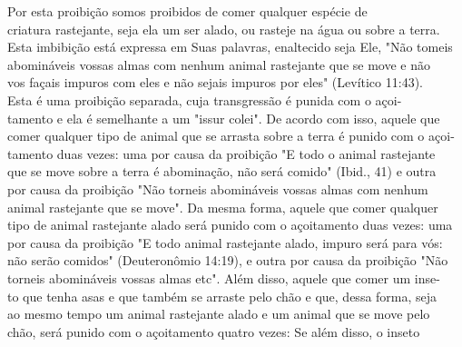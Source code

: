 Por esta proibição somos proibidos de comer qualquer espécie de\\
criatura rastejante, seja ela um ser alado, ou rasteje na água ou sobre
a terra.\\
Esta imbibição está expressa em Suas palavras, enaltecido seja Ele, "Não
tomeis\\
abomináveis vossas almas com nenhum animal rastejante que se move e
não\\
vos façais impuros com eles e não sejais impuros por eles" (Levítico
11:43).\\
Esta é uma proibição separada, cuja transgressão é punida com o açoi-\\
tamento e ela é semelhante a um "issur colei". De acordo com isso,
aquele que\\
comer qualquer tipo de animal que se arrasta sobre a terra é punido com
o açoi-\\
tamento duas vezes: uma por causa da proibição "E todo o animal
rastejante\\
que se move sobre a terra é abominação, não será comido" (Ibid., 41) e
outra\\
por causa da proibição "Não torneis abomináveis vossas almas com
nenhum\\
animal rastejante que se move". Da mesma forma, aquele que comer
qualquer\\
tipo de animal rastejante alado será punido com o açoitamento duas
vezes: uma\\
por causa da proibição "E todo animal rastejante alado, impuro será para
vós:\\
não serão comidos" (Deuteronômio 14:19), e outra por causa da proibição
"Não\\
torneis abomináveis vossas almas etc". Além disso, aquele que comer um
inse-\\
to que tenha asas e que também se arraste pelo chão e que, dessa forma,
seja\\
ao mesmo tempo um animal rastejante alado e um animal que se move pelo\\
chão, será punido com o açoitamento quatro vezes: Se além disso, o
inseto

